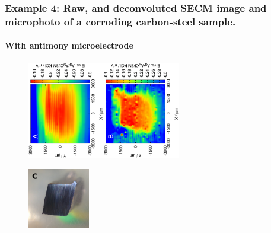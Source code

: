 \documentclass{beamer}
\begin{document}
\begin{frame}
\frametitle{Example 4: Raw, and deconvoluted SECM image and microphoto of a corroding carbon-steel sample.}
\framesubtitle{With antimony microelectrode}
\begin{figure}
\centering
\includegraphics[trim = 10mm 30mm 0mm 10mm, clip, width=0.3\textwidth, angle=-90]{16012906.eps}\includegraphics[trim = 10mm 30mm 0mm 10mm, clip, width=0.3\textwidth, angle=-90]{16012906_deconvoluted.eps}

\includegraphics[width=0.24\textwidth]{cs_cut.jpg}

\end{figure}
\end{frame}
\end{document}
